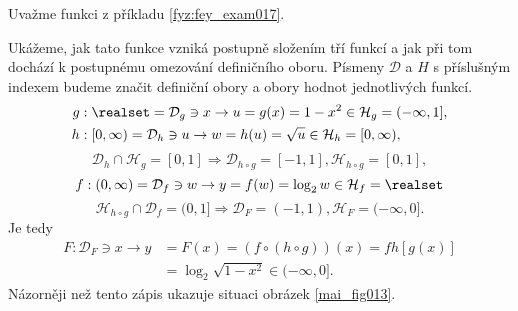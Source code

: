 \wikitextrule
\begin{example}\label{MAI:exam025}
  Uvažme funkci z příkladu \ref{fyz:fey_exam017}. 
  
  {\centering
   \captionsetup{type=figure}
   
  \par}
  
  Ukážeme, jak tato funkce vzniká postupně složením tří funkcí a jak při tom dochází k postupnému 
  omezování definičního oboru. Písmeny \(\mathcal{D}\) a \(H\) s příslušným indexem budeme značit 
  definiční obory a obory hodnot jednotlivých funkcí.
  \begin{align*}
    g&:  \realset =\mathcal{D}_g\ni x\rightarrow u=g(x) = 1- x^2  \in\mathcal{H}_g=(-\infty,1], \\
    h&: [0,\infty)=\mathcal{D}_h\ni u\rightarrow w=h(u) = \sqrt{u}\in\mathcal{H}_h=[0,\infty),
  \end{align*}
  \begin{equation*}
    \mathcal{D}_h\cap\mathcal{H}_g = [0,1]\Rightarrow\mathcal{D}_{h\circ g}=[-1,1], 
    \mathcal{H}_{h\circ g} = [0,1], 
  \end{equation*}
  \begin{equation*}
    f:(0,\infty)=\mathcal{D}_f\ni w \rightarrow y=f(w)=\log_2w\in\mathcal{H}_f=\realset
  \end{equation*}
  \begin{equation*}
    \mathcal{H}_{h\circ g}\cap\mathcal{D}_f = (0,1] 
    \Rightarrow\mathcal{D}_F=(-1,1),\mathcal{H}_F=(-\infty,0]. 
  \end{equation*}
  Je tedy
  \begin{align*}
    F:\mathcal{D}_F\ni x\rightarrow 
    y&=F(x)=(f\circ(h\circ g))(x) = f{h[g(x)]}          \\
     &= \log_2\sqrt{1-x^2}\in(-\infty,0].
  \end{align*}
  Názorněji než tento zápis ukazuje situaci obrázek \ref{mai_fig013}.
\end{example}
